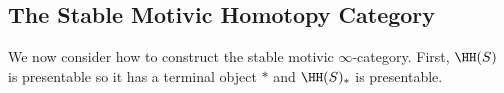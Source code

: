 \documentclass[12pt]{article}
\numberwithin{equation}{section}
\numberwithin{lemma}{section}
\numberwithin{theorem}{section}
\numberwithin{proposition}{section}
\numberwithin{corollary}{section}
\numberwithin{definition}{section}
\numberwithin{example}{section}
\numberwithin{remark}{section}
\begin{document}
\subsection{The Stable Motivic Homotopy Category}

We now consider how to construct the stable motivic
$\infty$-category. First, $\HH(S)$ is presentable so it has a terminal
object $*$ and $\HH(S)_{*}$ is presentable.





\nocite{*}



\printindex
\end{document}
